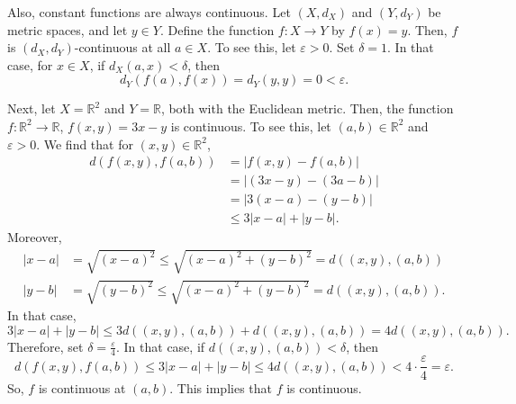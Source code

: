 \documentclass[a4paper, openany]{memoir}
\theoremstyle{definition}
\theoremstyle{plain}
\begin{document}
Also, constant functions are always continuous. Let $(X, d_X)$ and $(Y, d_Y)$ be metric spaces, and let $y \in Y$. Define the function $f: X \to Y$ by $f(x) = y$. Then, $f$ is $(d_X, d_Y)$-continuous at all $a \in X$. To see this, let $\varepsilon > 0$. Set $\delta = 1$. In that case, for $x \in X$, if $d_X(a, x) < \delta$, then
\[d_Y(f(a), f(x)) = d_Y(y, y) = 0 < \varepsilon.\]

Next, let $X = \mathbb{R}^2$ and $Y = \mathbb{R}$, both with the Euclidean metric. Then, the function $f: \mathbb{R}^2 \to \mathbb{R}$, $f(x, y) = 3x - y$ is continuous. To see this, let $(a, b) \in \mathbb{R}^2$ and $\varepsilon > 0$. We find that for $(x, y) \in \mathbb{R}^2$,
\begin{align*}
    d(f(x, y), f(a, b)) &= |f(x, y) - f(a, b)| \\
    &= |(3x - y) - (3a - b)| \\
    &= |3(x-a) - (y-b)| \\
    &\leqslant 3|x - a| + |y - b|.
\end{align*}
Moreover,
\begin{align*}
    |x-a| &= \sqrt{(x-a)^2} \leqslant \sqrt{(x-a)^2 + (y-b)^2} = d((x, y), (a, b))\\
    |y-b| &= \sqrt{(y-b)^2} \leqslant \sqrt{(x-a)^2 + (y-b)^2} = d((x, y), (a, b)).
\end{align*}
In that case, 
\[3|x-a| + |y-b| \leqslant 3d((x, y), (a, b)) + d((x, y), (a, b)) = 4d((x, y), (a, b)).\]
Therefore, set $\delta = \frac{\varepsilon}{4}$. In that case, if $d((x, y), (a, b)) < \delta$, then 
\[d(f(x, y), f(a, b)) \leqslant 3|x-a| + |y-b| \leqslant 4d((x, y), (a, b)) < 4 \cdot \frac{\varepsilon}{4} = \varepsilon.\]
So, $f$ is continuous at $(a, b)$. This implies that $f$ is continuous.
\end{document}
